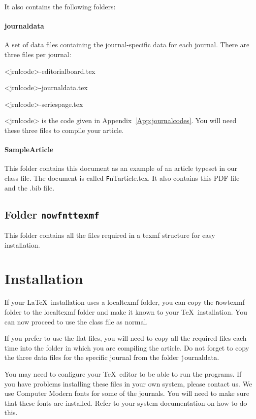 \documentclass[examplefnt,biber]{nowfnt} %
\begin{document}
\noindent It also contains the following folders:


\paragraph{journaldata}
A set of data files containing the journal-specific data for each journal. There
are three files per journal:

<jrnlcode>-editorialboard.tex

<jrnlcode>-journaldata.tex

<jrnlcode>-seriespage.tex

\noindent <jrnlcode> is the code given in Appendix~\ref{App:journalcodes}. You will need these three files to compile your article.

\paragraph{SampleArticle}
This folder contains this document as an example of an article typeset in our class file. The document is called
{\texttt FnTarticle.tex}. It also contains this PDF file and the .bib file.

\subsection{Folder \texttt{nowfnttexmf}}
This folder contains all the files required in a texmf structure for easy installation.

\section{Installation}
If your \LaTeX\ installation uses a localtexmf folder, you can copy the {\texttt nowtexmf} folder to the localtexmf
folder and make it known to your \TeX\ installation. You can now proceed to use the class file as normal.

If you prefer to use the flat files, you will need to 
copy all the required files each time into the folder in which you are compiling the article. Do not 
forget to copy the three data files for the specific journal from the folder {\texttt journaldata}.

You may need to configure your \TeX\ editor to be able to run the programs. If you have problems 
installing these files in your own system, please contact us. 
We use Computer Modern fonts for some of the journals. You will need to make sure that these
 fonts are installed. Refer to your system documentation on how to do this.
\end{document}
